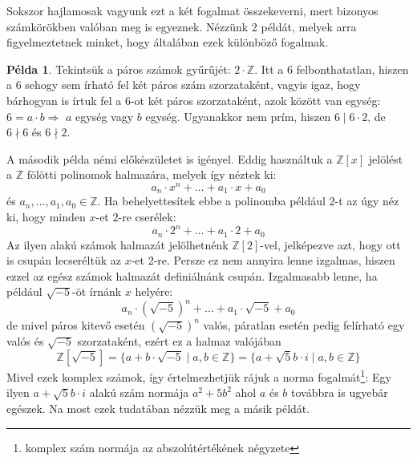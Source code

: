 \documentclass[12pt]{book}
\theoremstyle{plain} %
\theoremstyle{definition} %
\newtheorem{pl}{Példa}[section]
\theoremstyle{remark}
\numberwithin{equation}{section}  %
\begin{document}
	Sokszor hajlamosak vagyunk ezt a két fogalmat összekeverni, mert bizonyos számkörökben valóban meg is egyeznek. Nézzünk 2 példát, melyek arra figyelmeztetnek minket, hogy általában ezek különböző fogalmak.
	\begin{pl}
		Tekintsük a páros számok gyűrűjét: $2\cdot \mathbb{Z}$. Itt a $6$ felbonthatatlan, hiszen a $6$ sehogy sem írható fel két páros szám szorzataként, vagyis igaz, hogy bárhogyan is írtuk fel a 6-ot két páros szorzataként, azok között van egység: $6=a\cdot b \Rightarrow $ $a$ egység vagy $b$ egység. Ugyanakkor nem prím, hiszen $6\mid 6\cdot 2$, de $6\nmid 6$ és $6\nmid 2$.
	\end{pl}
	A második példa némi előkészületet is igényel. Eddig használtuk a $\mathbb{Z}[x]$ jelölést a $\mathbb{Z}$ fölötti polinomok halmazára, melyek így néztek ki:
	\[ a_n\cdot x^n + \ldots + a_1\cdot x + a_0  \]
	és $a_n, \ldots, a_1, a_0 \in \mathbb{Z}$. Ha behelyettesítek ebbe a polinomba például 2-t az úgy néz ki, hogy minden $x$-et $2$-re cserélek:
	\[ a_n\cdot 2^n + \ldots + a_1\cdot 2 + a_0  \]
	Az ilyen alakú számok halmazát jelölhetnénk $\mathbb{Z}[2]$-vel, jelképezve azt, hogy ott is csupán lecseréltük az $x$-et 2-re. Persze ez nem annyira lenne izgalmas, hiszen ezzel az egész számok halmazát definiálnánk csupán. Izgalmasabb lenne, ha például $\sqrt{-5}$-öt írnánk $x$ helyére:
	\[ a_n\cdot \left (\sqrt{-5}\right)^n + \ldots + a_1\cdot \sqrt{-5} + a_0  \]
	de mivel páros kitevő esetén $\left (\sqrt{-5}\right )^n$ valós, páratlan esetén pedig felírható egy valós és $\sqrt{-5}$ szorzataként, ezért ez a halmaz valójában
	\[ \mathbb{Z}\left[\sqrt{-5}\right] = \{ a+b\cdot \sqrt{-5} \mid a,b\in \mathbb{Z}  \} = 
	\{ a+\sqrt{5}b\cdot i \mid a,b\in \mathbb{Z}  \} \]
	Mivel ezek komplex számok, így értelmezhetjük rájuk a norma fogalmát\footnote{komplex szám normája az abszolútértékének négyzete}: Egy ilyen $a+\sqrt{5}b\cdot i$ alakú szám normája $a^2+5b^2$ ahol $a$ és $b$ továbbra is ugyebár egészek. Na most ezek tudatában nézzük meg a másik példát.
\end{document}
